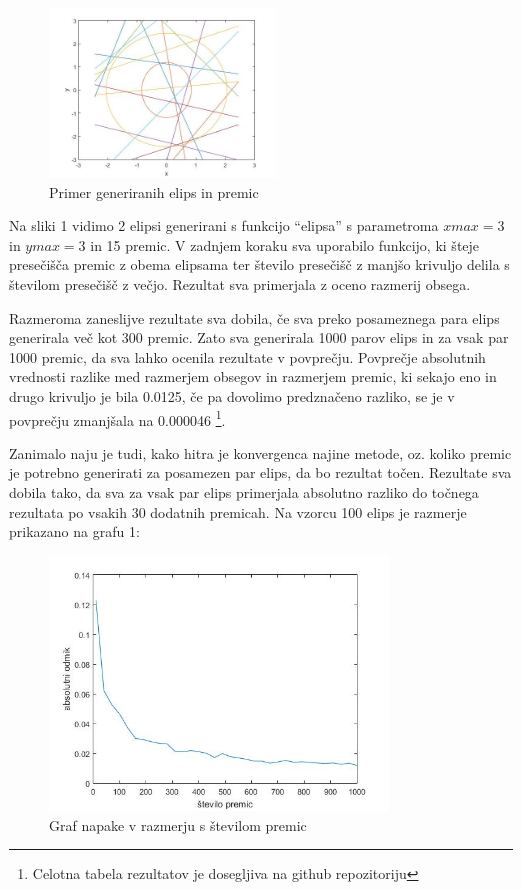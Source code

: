 \documentclass[a4paper]{article}
\begin{document}
\begin{figure}[h]
\centering
\includegraphics[width=60mm]{graf_primer.jpg}
\caption{Primer generiranih elips in premic \label{overflow}}
\end{figure} 

Na sliki 1 vidimo 2 elipsi generirani s funkcijo ``elipsa'' s parametroma $xmax=3$ in $ymax=3$ in 15 premic. V zadnjem koraku sva uporabilo funkcijo, ki šteje presečišča premic z obema elipsama ter število presečišč z manjšo krivuljo delila s številom presečišč z večjo. Rezultat sva primerjala z oceno razmerij obsega. 

Razmeroma zaneslijve rezultate sva dobila, če sva preko posameznega para elips generirala več kot 300 premic. Zato sva generirala 1000 parov elips in za vsak par 1000 premic, da sva lahko ocenila rezultate v povprečju. Povprečje absolutnih vrednosti razlike med razmerjem obsegov in razmerjem premic, ki sekajo eno in drugo krivuljo je bila 0.0125, če pa dovolimo predznačeno razliko, se je v povprečju zmanjšala na 0.000046 \footnote[1]{Celotna tabela rezultatov je dosegljiva na github repozitoriju}.

Zanimalo naju je tudi, kako hitra je konvergenca najine metode, oz. koliko premic je potrebno generirati za posamezen par elips, da bo rezultat točen. Rezultate sva dobila tako, da sva za vsak par elips primerjala absolutno razliko do točnega rezultata po vsakih 30 dodatnih premicah. Na vzorcu 100 elips je razmerje prikazano na grafu 1: 

\begin{figure}[h]
\centering
\includegraphics[width=90mm]{graf_elipsa2.jpg}
\caption{Graf napake v razmerju s številom premic \label{overflow}}
\end{figure} 
\end{document}
